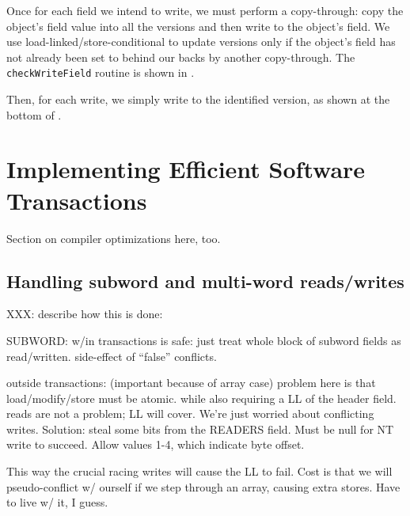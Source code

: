 Once for each field we intend to write, we must perform a
copy-through: copy the object's field value into all the versions and
then write \FLAG to the object's field.  We use
load-linked/store-conditional to update versions only if the object's
field has not already been set to \FLAG behind our backs by another
copy-through.  The {\tt checkWriteField} routine is shown in
.

Then, for each write, we simply write to the identified version, as
shown at the bottom of .

\chapter{Implementing Efficient Software Transactions}

Section on compiler optimizations here, too.

\section{Handling subword and multi-word reads/writes}

XXX: describe how this is done:

SUBWORD:
w/in transactions is safe: just treat whole block of subword fields
as read/written.  side-effect of ``false'' conflicts.

outside transactions: (important because of array case)
  problem here is that load/modify/store must be atomic.
  while also requiring a LL of the header field.
  reads are not a problem; LL will cover.
  We're just worried about conflicting writes.  Solution:
   steal some bits from the READERS field.  Must be null for
   NT write to succeed.  Allow values 1-4, which indicate byte offset.


  This way the crucial racing writes will cause the LL to fail.
  Cost is that we will pseudo-conflict w/ ourself if we step through
  an array, causing extra stores.  Have to live w/ it, I guess.

